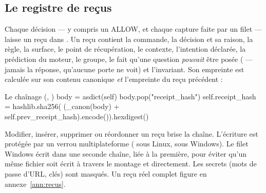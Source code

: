 \subsection{Le registre de reçus}
Chaque décision --- y compris un ALLOW, et chaque capture faite par un filet --- laisse un reçu
dans . Un reçu contient la commande, la décision et sa
raison, la règle, la surface, le point de récupération, le contexte, l'intention déclarée, la
prédiction du moteur, le groupe, le fait qu'une question \emph{pouvait} être posée
( --- jamais la réponse, qu'aucune porte ne voit) et l'invariant. Son
empreinte est calculée sur son contenu canonique \emph{et} l'empreinte du reçu précédent :

\begin{code}{Le chaînage (, )}
body = asdict(self)
body.pop("receipt_hash")
self.receipt_hash = hashlib.sha256(
    (_canon(body) + self.prev_receipt_hash).encode()).hexdigest()
\end{code}

Modifier, insérer, supprimer ou réordonner un reçu brise la chaîne. L'écriture est protégée par
un verrou multiplateforme ( sous Linux,  sous Windows). Le filet Windows
écrit dans une seconde chaîne, liée à la première, pour éviter qu'un même fichier soit écrit
à travers le montage et directement. Les secrets (mots de passe d'URL, clés) sont masqués. Un
reçu réel complet figure en annexe~\ref{ann:recus}.

